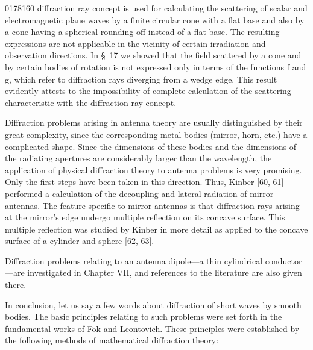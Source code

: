 \begin{scanpage}{0178}{160}
diffraction ray concept is used for calculating the scattering of scalar and electromagnetic plane waves by a finite circular cone with a flat base and also by a cone having a spherical rounding off instead of a flat base. The resulting expressions are not applicable in the vicinity of certain irradiation and observation directions. In \S~17 we showed that the field scattered by a cone and by certain bodies of rotation is not expressed only in terms of the functions f and g, which refer to diffraction rays diverging from a wedge edge. This result evidently attests to the impossibility of complete calculation of the scattering characteristic with the diffraction ray concept.

Diffraction problems arising in antenna theory are usually distinguished by their great complexity, since the corresponding metal bodies (mirror, horn, etc.) have a complicated shape. Since the dimensions of these bodies and the dimensions of the radiating apertures are considerably larger than the wavelength, the application of physical diffraction theory to antenna problems is very promising. Only the first steps have been taken in this direction. Thus, Kinber [60, 61] performed a calculation of the decoupling and lateral radiation of mirror antennas. The feature specific to mirror antennas is that diffraction rays arising at the mirror's edge undergo multiple reflection on its concave surface. This multiple reflection was studied by Kinber in more detail as applied to the concave surface of a cylinder and sphere [62, 63].

Diffraction problems relating to an antenna dipole---a thin cylindrical conductor---are investigated in Chapter VII, and references to the literature are also given there.

In conclusion, let us say a few words about diffraction of short waves by smooth bodies. The basic principles relating to such problems were set forth in the fundamental works of Fok and Leontovich. These principles were established by the following methods of mathematical diffraction theory:
\end{scanpage}
